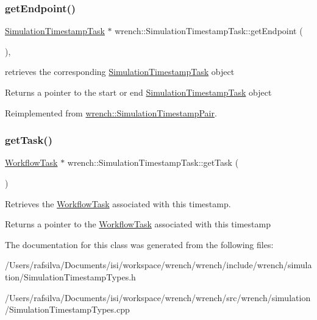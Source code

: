 \subsubsection{\texorpdfstring{get\+Endpoint()}{getEndpoint()}}
{\footnotesize\ttfamily \hyperlink{classwrench_1_1_simulation_timestamp_task}{Simulation\+Timestamp\+Task} $\ast$ wrench\+::\+Simulation\+Timestamp\+Task\+::get\+Endpoint (\begin{DoxyParamCaption}{ }\end{DoxyParamCaption})\hspace{0.3cm}{\ttfamily [override]}, {\ttfamily [virtual]}}



retrieves the corresponding \hyperlink{classwrench_1_1_simulation_timestamp_task}{Simulation\+Timestamp\+Task} object 

\begin{DoxyReturn}{Returns}
a pointer to the start or end \hyperlink{classwrench_1_1_simulation_timestamp_task}{Simulation\+Timestamp\+Task} object 
\end{DoxyReturn}


Reimplemented from \hyperlink{classwrench_1_1_simulation_timestamp_pair_aa47d05297b863c29179a505ea4e5dfdf}{wrench\+::\+Simulation\+Timestamp\+Pair}.

\mbox{\label{classwrench_1_1_simulation_timestamp_task_a9a9440d71940fccf0fb33383ce056a37}} 
\subsubsection{\texorpdfstring{get\+Task()}{getTask()}}
{\footnotesize\ttfamily \hyperlink{classwrench_1_1_workflow_task}{Workflow\+Task} $\ast$ wrench\+::\+Simulation\+Timestamp\+Task\+::get\+Task (\begin{DoxyParamCaption}{ }\end{DoxyParamCaption})}



Retrieves the \hyperlink{classwrench_1_1_workflow_task}{Workflow\+Task} associated with this timestamp. 

\begin{DoxyReturn}{Returns}
a pointer to the \hyperlink{classwrench_1_1_workflow_task}{Workflow\+Task} associated with this timestamp 
\end{DoxyReturn}


The documentation for this class was generated from the following files\+:\begin{DoxyCompactItemize}
\item 
/\+Users/rafsilva/\+Documents/isi/workspace/wrench/wrench/include/wrench/simulation/Simulation\+Timestamp\+Types.\+h\item 
/\+Users/rafsilva/\+Documents/isi/workspace/wrench/wrench/src/wrench/simulation/Simulation\+Timestamp\+Types.\+cpp\end{DoxyCompactItemize}
